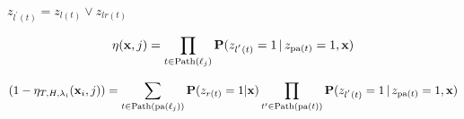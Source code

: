 \documentclass{article}
\newcommand{\R}{\mathbb{R}}
\newcommand{\cH}{\mathcal{H}}
\newcommand{\cL}{\mathcal{L}}
\newcommand{\path}{\text{Path}}
\newcommand{\Path}[1]{\mathrm{Path}(#1)}
\newcommand{\pa}[1]{\mathrm{pa}(#1)}
\newcommand{\leaves}{d}
\renewcommand{\vec}[1]{\mathbf{#1}}
\newcommand{\bx}{\mathbf{x}}
\newcommand{\by}{\vec{y}}
\newcommand{\prob}{\mathbf{P}}
\newcommand{\given}{\, | \,}
\newcommand{\Algo}[1]{\textsc{#1}}
\begin{document}
$z_{l^{\prime}(t)} = z_{l(t)} \vee z_{lr(t)}$ 

\begin{equation}
\eta(\bx, j) = \prod_{t \in \Path{\ell_j}} \prob(z_{l^{'}(t)} = 1 \given z_{\pa{t}} =1, \bx)\notag 
\end{equation}


\[
(1-\eta_{T,H,\lambda_i} ( \bx_i , j )) = \sum_{t \in \Path{\pa{\ell_j}}}   \prob(z_{r(t)} = 1 | \bx)  \prod_{t' \in \Path{\pa{t}}} \prob(z_{l^{'}(t)} = 1 \given z_{\pa{t}} =1, \bx)  \notag
\]






\end{document}
